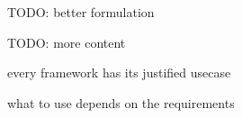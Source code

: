 TODO: better formulation

TODO: more content

every framework has its justified usecase 

what to use depends on the requirements
